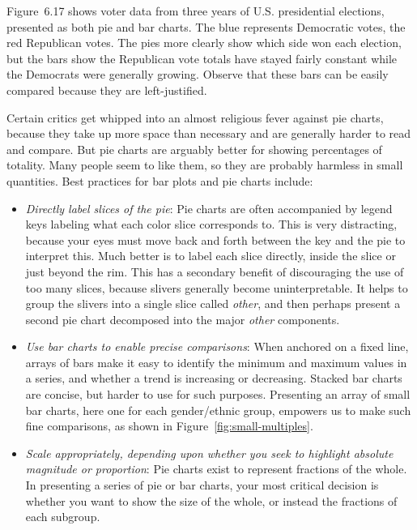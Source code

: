 \documentclass[10pt]{article}
\begin{document}
Figure~6.17 shows voter data from three years of U.S. presidential elections, presented as both pie and bar charts. The blue represents Democratic votes, the red Republican votes. The pies more clearly show which side won each election, but the bars show the Republican vote totals have stayed fairly constant while the Democrats were generally growing. Observe that these bars can be easily compared because they are left-justified.

Certain critics get whipped into an almost religious fever against pie charts, because they take up more space than necessary and are generally harder to read and compare. But pie charts are arguably better for showing percentages of totality. Many people seem to like them, so they are probably harmless in small quantities. Best practices for bar plots and pie charts include:

\begin{itemize}
  \item \textit{Directly label slices of the pie}: Pie charts are often accompanied by legend keys labeling what each color slice corresponds to. This is very distracting, because your eyes must move back and forth between the key and the pie to interpret this. Much better is to label each slice directly, inside the slice or just beyond the rim. This has a secondary benefit of discouraging the use of too many slices, because slivers generally become uninterpretable. It helps to group the slivers into a single slice called \textit{other}, and then perhaps present a second pie chart decomposed into the major \textit{other} components.
  \item \textit{Use bar charts to enable precise comparisons}: When anchored on a fixed line, arrays of bars make it easy to identify the minimum and maximum values in a series, and whether a trend is increasing or decreasing. Stacked bar charts are concise, but harder to use for such purposes. Presenting an array of small bar charts, here one for each gender/ethnic group, empowers us to make such fine comparisons, as shown in Figure~\ref{fig:small-multiples}.
  \item \textit{Scale appropriately, depending upon whether you seek to highlight absolute magnitude or proportion}: Pie charts exist to represent fractions of the whole. In presenting a series of pie or bar charts, your most critical decision is whether you want to show the size of the whole, or instead the fractions of each subgroup.
\end{itemize}
\end{document}
